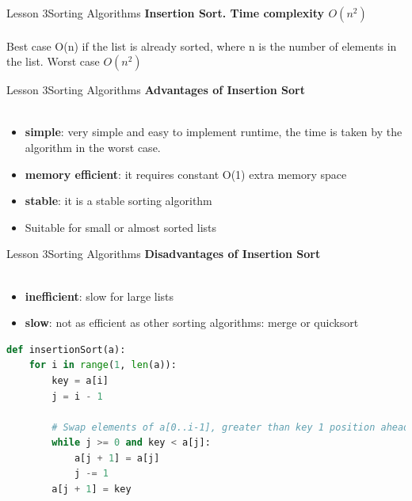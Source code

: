\documentclass[aspectratio=1610]{beamer}
\begin{document}
\begin{frame}{Lesson 3}{Sorting Algorithms}
\LARGE
\textbf{Insertion Sort. Time complexity $O(n^2)$}\\~\\
Best case O(n) if the list is already sorted, where n is the number of elements in
the list. Worst case $O(n^2)$
\end{frame}


\begin{frame}{Lesson 3}{Sorting Algorithms}
\LARGE
\textbf{Advantages of Insertion Sort}\\~\\
\Large
\begin{itemize}
	\item \textbf{simple}: very simple and easy to implement
 runtime, the time is taken by the algorithm in the worst case.
	\item \textbf{memory efficient}: it requires constant O(1) extra memory space
	\item \textbf{stable}: it is a stable sorting algorithm
	\item Suitable for small or almost sorted lists
\end{itemize}
\end{frame}


\begin{frame}{Lesson 3}{Sorting Algorithms}
\LARGE
\textbf{Disadvantages of Insertion Sort}\\~\\
\Large
\begin{itemize}
	\item \textbf{inefficient}: slow for large lists
	\item \textbf{slow}: not as efficient as other sorting algorithms: merge or quicksort
\end{itemize}

\end{frame}


\begin{frame}[fragile]
\begin{lstlisting}[language=Python]
def insertionSort(a):
    for i in range(1, len(a)):
        key = a[i]
        j = i - 1

        # Swap elements of a[0..i-1], greater than key 1 position ahead
        while j >= 0 and key < a[j]:
            a[j + 1] = a[j]
            j -= 1
        a[j + 1] = key

\end{lstlisting}
\end{frame}
\end{document}
